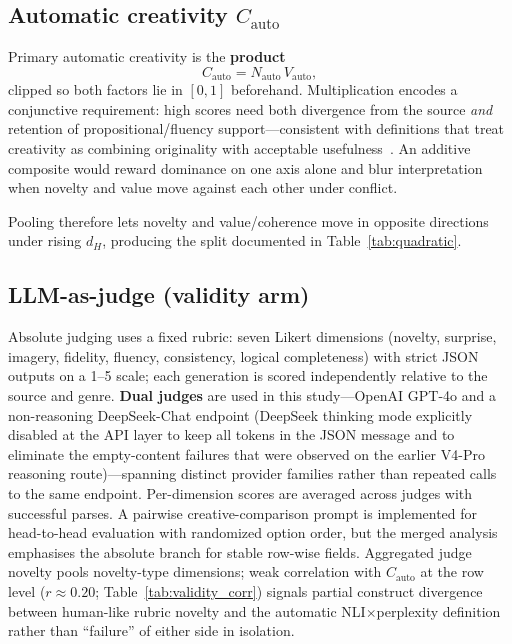 \documentclass[sigconf,nonacm]{acmart}
\begin{document}
\subsection{Automatic creativity $C_{\mathrm{auto}}$}

Primary automatic creativity is the \textbf{product}
\[
  C_{\mathrm{auto}} = N_{\mathrm{auto}}\, V_{\mathrm{auto}},
\]
clipped so both factors lie in $[0,1]$ beforehand. Multiplication encodes a conjunctive requirement: high scores need both divergence from the source \emph{and} retention of propositional/fluency support---consistent with definitions that treat creativity as combining originality with acceptable usefulness~\cite{runco}. An additive composite would reward dominance on one axis alone and blur interpretation when novelty and value move against each other under conflict.

Pooling therefore lets novelty and value/coherence move in opposite directions under rising $d_H$, producing the split documented in Table~\ref{tab:quadratic}.

\subsection{LLM-as-judge (validity arm)}

Absolute judging uses a fixed rubric: seven Likert dimensions (novelty, surprise, imagery, fidelity, fluency, consistency, logical completeness) with strict JSON outputs on a 1--5 scale; each generation is scored independently relative to the source and genre. \textbf{Dual judges} are used in this study---OpenAI GPT-4o and a non-reasoning DeepSeek-Chat endpoint (DeepSeek thinking mode explicitly disabled at the API layer to keep all tokens in the JSON message and to eliminate the empty-content failures that were observed on the earlier V4-Pro reasoning route)---spanning distinct provider families rather than repeated calls to the same endpoint. Per-dimension scores are averaged across judges with successful parses. A pairwise creative-comparison prompt is implemented for head-to-head evaluation with randomized option order, but the merged analysis emphasises the absolute branch for stable row-wise fields. Aggregated judge novelty pools novelty-type dimensions; weak correlation with $C_{\mathrm{auto}}$ at the row level ($r{\approx}0.20$; Table~\ref{tab:validity_corr}) signals partial construct divergence between human-like rubric novelty and the automatic NLI$\times$perplexity definition rather than ``failure'' of either side in isolation.
\end{document}
